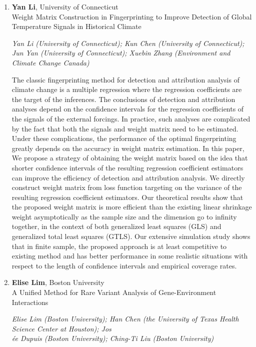 \begin{enumerate}
\item \textbf{Yan Li}, University of Connecticut \\
Weight Matrix Construction in Fingerprinting to Improve Detection of Global Temperature Signals in Historical Climate

\emph{\footnotesize Yan Li (University of Connecticut); Kun Chen (University of Connecticut); Jun Yan (University of Connecticut); Xuebin Zhang (Environment and Climate Change Canada)}

The classic fingerprinting method for detection and attribution analysis of climate change is a multiple regression where the regression coefficients are the target of the inferences. The conclusions of detection and attribution analyses depend on the confidence intervals for the regression coefficients of the signals of the external forcings. In practice, such analyses are complicated by the fact that both the signals and weight matrix need to be estimated. Under these complications, the performance of the optimal fingerprinting greatly depends on the accuracy in weight matrix estimation. In this paper, We propose a strategy of obtaining the weight matrix based on the idea that shorter confidence intervals of the resulting regression coefficient estimators can improve the efficiency of detection and attribution analysis. We directly construct weight matrix from loss function targeting on the variance of the resulting regression coefficient estimators. Our theoretical results show that the proposed weight matrix is more efficient than the existing linear shrinkage weight asymptotically as the sample size and the dimension go to infinity together, in the context of both generalized least squares (GLS) and generalized total least squares (GTLS). Our extensive simulation study shows that in finite sample, the proposed approach is at least competitive to existing method and has better performance in some realistic situations with respect to the length of confidence intervals and empirical coverage rates.

\item \textbf{Elise Lim}, Boston University \\
A Unified Method for Rare Variant Analysis of Gene-Environment Interactions

\emph{\footnotesize Elise Lim (Boston University); Han Chen (the University of Texas Health Science Center at Houston); Jos\\\'ee Dupuis (Boston University); Ching-Ti Liu (Boston University)}


\end{enumerate}
